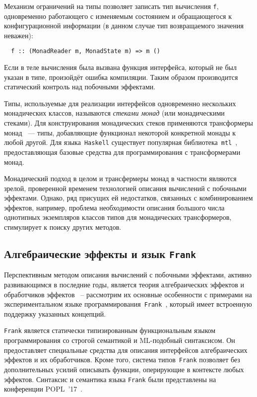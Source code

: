 \documentclass [a4paper] {article}
\begin{document}
Механизм ограничений на типы позволяет записать тип вычисления \texttt{f}, одновременно работающего с изменяемым состоянием и обращающегося к конфигурационной информации (в данном случае тип возвращаемого значения неважен):
\begin{verbatim}
  f :: (MonadReader m, MonadState m) => m ()
\end{verbatim}
Если в теле вычисления была вызвана функция интерфейса,
который не был указан в типе, произойдёт ошибка компиляции.
Таким образом производится статический контроль над побочными
эффектами.

Типы, используемые для реализации интерфейсов одновременно нескольких
монадических классов, называются \emph{стеками монад} (или монадическими стеками). Для конструирования
монадических стеков применяются трансформеры монад~\cite{monadTransformers}
--- типы,
добавляющие функционал некоторой конкретной монады к любой другой. Для
языка~\texttt{Haskell} существует популярная библиотека~\texttt{mtl}~\cite{mtlHackage},
предоставляющая базовые средства для программирования с трансформерами монад.

Монадический подход в целом и трансфермеры монад в частности являются зрелой,
проверенной временем технологией описания вычислений с побочными эффектами.
Однако, ряд присущих ей недостатков, связанных с комбинированием эффектов,
например, проблема необходимости описания большого числа однотипных
экземпляров классов типов для монадических трансформеров, стимулирует к поиску других методов.

\subsection{Алгебраические эффекты и язык \texttt{Frank}}

Перспективным методом описания вычислений с побочными эффектами, активно
развивающимся в последние годы, является теория алгебраических
эффектов и обработчиков эффектов~\cite{AlgEffects} -- рассмотрим их основные особенности с примерами на экспериментальном языке
программирования~\texttt{Frank}~\cite{Frank}, который имеет встроенную
поддержку указанных концепций.

\texttt{Frank} является статически типизированным функциональным
языком программирования со строгой семантикой и ML-подобный синтаксисом. Он предоставляет специальные средства для
описания интерфейсов алгебраических эффектов и их обработчиков.
Кроме того, система типов~\texttt{Frank} позволяет без дополнительных усилий описывать
функции, оперирующие в контексте любых эффектов. Синтаксис и семантика языка
\texttt{Frank} были представлены на конференции POPL~'17~\cite{Frank}.
\end{document}
